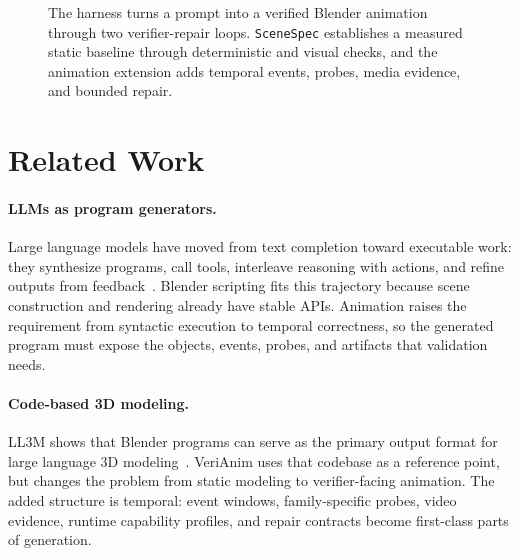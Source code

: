 \documentclass{article}
\newcommand{\code}[1]{\texttt{#1}}
\begin{document}
\begin{figure}[t]
{
}
\caption{The harness turns a prompt into a verified Blender animation through two verifier-repair loops. \code{SceneSpec} establishes a measured static baseline through deterministic and visual checks, and the animation extension adds temporal events, probes, media evidence, and bounded repair.}
\label{fig:architecture}
\end{figure}

\section{Related Work}

\paragraph{LLMs as program generators.}
Large language models have moved from text completion toward executable work: they synthesize programs, call tools, interleave reasoning with actions, and refine outputs from feedback~\citep{chen2021evaluating,austin2021program,yao2023react,schick2023toolformer,madaan2023selfrefine,shinn2023reflexion}. Blender scripting fits this trajectory because scene construction and rendering already have stable APIs. Animation raises the requirement from syntactic execution to temporal correctness, so the generated program must expose the objects, events, probes, and artifacts that validation needs.

\paragraph{Code-based 3D modeling.}
LL3M shows that Blender programs can serve as the primary output format for large language 3D modeling~\citep{lu2025verianim}. VeriAnim uses that codebase as a reference point, but changes the problem from static modeling to verifier-facing animation. The added structure is temporal: event windows, family-specific probes, video evidence, runtime capability profiles, and repair contracts become first-class parts of generation.
\end{document}
